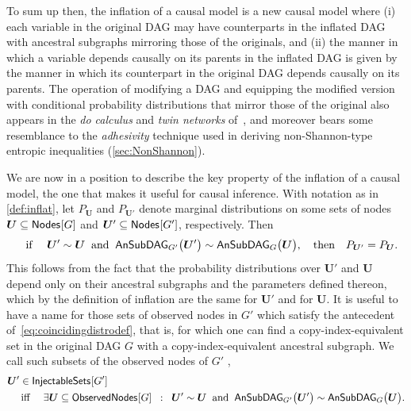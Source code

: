 To sum up then, the inflation of a causal model is a new causal model where (i) each variable in the original DAG may have counterparts in the inflated DAG with ancestral subgraphs mirroring those of the originals, and (ii) the manner in which a variable depends causally on its parents in the inflated DAG is given by the manner in which its counterpart in the original DAG depends causally on its parents. The operation of modifying a DAG and equipping the modified version with conditional probability distributions that mirror those of the original also appears in the \emph{do calculus} and \emph{twin networks} of~\citet{pearl2009causality}, and moreover bears some resemblance to the \emph{adhesivity} technique used in deriving non-Shannon-type entropic inequalities (\cref{sec:NonShannon}).

We are now in a position to describe the key property of the inflation of a causal model, the one that makes it useful for causal inference. With notation as in \cref{def:inflat}, let %
$P_{\bm{U}}$ and $P_{\bm{U}'}$ denote marginal distributions on some sets of nodes $\bm{U}\subseteq\nodes{G}$ and $\bm{U}'\subseteq\nodes{G'}$, respectively. Then
\begin{align}\label{eq:coincidingdistrodef}
\quad\text{if }\quad \bm{U}'\sim \bm{U} \;\;\text{and}\;\; \ansubgraph[G']{\bm{U}'}\sim\ansubgraph[G]{\bm{U}}, \quad\text{then}\quad P_{\bm{U}'}=P_{\bm{U}}.
\end{align}
This follows from the fact that the probability distributions over $\bm{U}'$ and $\bm{U}$ depend only on their ancestral subgraphs and the parameters defined thereon, which by the definition of inflation are the same for $\bm{U}'$ and for $\bm{U}$.
It is useful to have a name for those sets of observed nodes in $G'$ which satisfy the antecedent of~\cref{eq:coincidingdistrodef}, that is, for which one can find a copy-index-equivalent set in the original DAG $G$ with a copy-index-equivalent ancestral subgraph.  We call such subsets of the observed nodes of $G'$ ,
\begin{align}\begin{split}\label{eq:definjectable}
&\bm{U}'\in\SmallNamedFunction{InjectableSets}{G'} \\
&\quad\text{ iff }\quad \exists \bm{U}\subseteq \SmallNamedFunction{ObservedNodes}{G} \;\; :\;\; \bm{U}'\sim\bm{U} \;\;\text{and}\;\; \ansubgraph[G']{\bm{U}'}\sim\ansubgraph[G]{\bm{U}}.
\end{split}\end{align}

